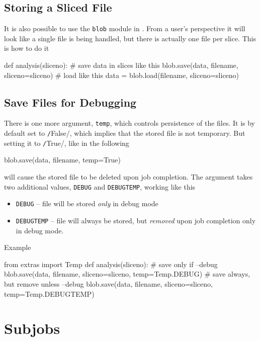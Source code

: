 \subsection*{Storing a Sliced File}
It is also possible to use the \texttt{blob} module in \analysis.
From a user's perspective it will look like a single file is being
handled, but there is actually one file per slice.  This is how to do
it
\begin{python}
def analysis(sliceno):
    # save data in slices like this
    blob.save(data, filename, sliceno=sliceno)
    # load like this
    data = blob.load(filename, sliceno=sliceno)
\end{python}

\subsection*{Save Files for Debugging}
There is one more argument, \texttt{temp}, which controls persistence
of the files.  It is by default set to \texttt/False/,
which implies that the stored file is not temporary.  But setting it
to \texttt/True/, like in the following
\begin{python}
    blob.save(data, filename, temp=True)
\end{python}
will cause the stored file to be deleted upon job completion.  The
argument takes two additional values, \texttt{DEBUG} and
\texttt{DEBUGTEMP}, working like this
\begin{itemize}
\item[] \texttt{DEBUG} -- file will be stored \emph{only} in debug
  mode
\item[] \texttt{DEBUGTEMP} -- file will always be stored, but
  \emph{removed} upon job completion only in debug mode.
\end{itemize}
Example
\begin{python}
from extras import Temp
def analysis(sliceno):
  # save only if --debug
  blob.save(data, filename, sliceno=sliceno, temp=Temp.DEBUG)
  # save always, but remove unless --debug
  blob.save(data, filename, sliceno=sliceno, temp=Temp.DEBUGTEMP)
\end{python}


\clearpage
\section{Subjobs}


